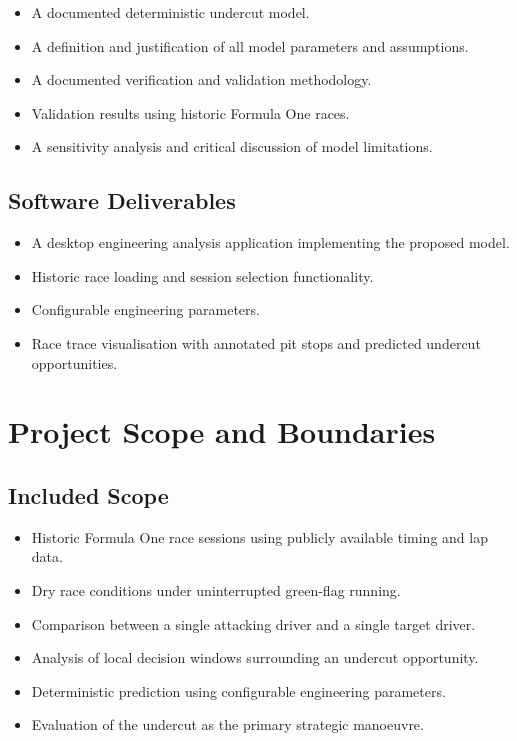 \begin{itemize}
    \item A documented deterministic undercut model.
    \item A definition and justification of all model parameters and assumptions.
    \item A documented verification and validation methodology.
    \item Validation results using historic Formula One races.
    \item A sensitivity analysis and critical discussion of model limitations.
\end{itemize}

\subsection{Software Deliverables}
\label{subsec:software-deliverables}

\begin{itemize}
    \item A desktop engineering analysis application implementing the proposed model.
    \item Historic race loading and session selection functionality.
    \item Configurable engineering parameters.
    \item Race trace visualisation with annotated pit stops and predicted undercut opportunities.
\end{itemize}

\section{Project Scope and Boundaries}
\label{sec:scope}

\subsection{Included Scope}

\begin{itemize}
    \item Historic Formula One race sessions using publicly available timing and lap data.
    \item Dry race conditions under uninterrupted green-flag running.
    \item Comparison between a single attacking driver and a single target driver.
    \item Analysis of local decision windows surrounding an undercut opportunity.
    \item Deterministic prediction using configurable engineering parameters.
    \item Evaluation of the undercut as the primary strategic manoeuvre.
\end{itemize}

